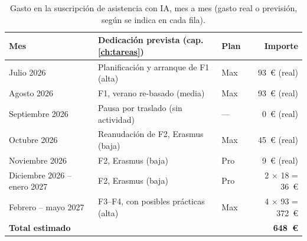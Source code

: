 \begin{table}[htbp]
  \centering
  \small
  \setlength{\tabcolsep}{4pt}
  \caption{Gasto en la suscripción de asistencia con \acs{IA}, mes a mes (gasto real o previsión, según se indica en cada fila).}
  \label{tab:gasto-ia}
  \begin{tabular}{lllr}
    \toprule
    \textbf{Mes} & \textbf{Dedicación prevista (cap. \ref{ch:tareas})} & \textbf{Plan} & \textbf{Importe} \\
    \midrule
    Julio 2026                  & Planificación y arranque de F1 (alta) & Max & 93~€ (real) \\
    Agosto 2026                 & F1, verano re-basado (media)          & Max & 93~€ (real) \\
    Septiembre 2026             & Pausa por traslado (sin actividad)    & --- & 0~€ (real) \\
    Octubre 2026                & Reanudación de F2, Erasmus (baja)     & Max & 45~€ (real) \\
    Noviembre 2026              & F2, Erasmus (baja)                   & Pro & 9~€ (real) \\
    Diciembre 2026 -- enero 2027 & F2, Erasmus (baja)                   & Pro & 2 $\times$ 18 = 36~€ \\
    Febrero -- mayo 2027        & F3--F4, con posibles prácticas (alta) & Max & 4 $\times$ 93 = 372~€ \\
    \midrule
    \textbf{Total estimado}     &                                       &     & \textbf{648~€} \\
    \bottomrule
  \end{tabular}
\end{table}

